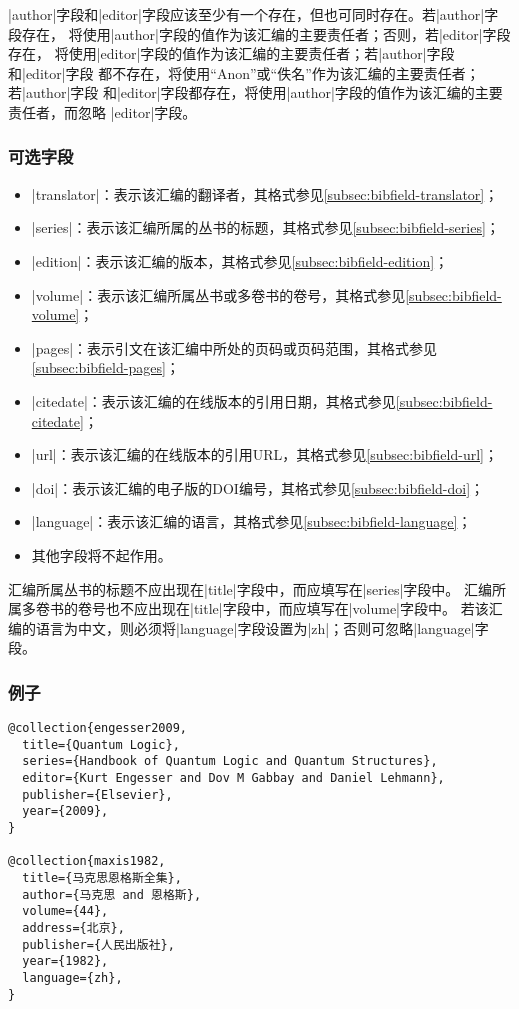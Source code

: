 \begin{note}
|author|字段和|editor|字段应该至少有一个存在，但也可同时存在。若|author|字段存在，
{\BibTeX}将使用|author|字段的值作为该汇编的主要责任者；否则，若|editor|字段存在，
{\BibTeX}将使用|editor|字段的值作为该汇编的主要责任者；若|author|字段和|editor|字段
都不存在，{\BibTeX}将使用``Anon''或``佚名''作为该汇编的主要责任者；若|author|字段
和|editor|字段都存在，{\BibTeX}将使用|author|字段的值作为该汇编的主要责任者，而忽略
|editor|字段。
\end{note}

\subsubsection{可选字段}

\begin{itemize}
\item |translator|：表示该汇编的翻译者，其格式参见\ref{subsec:bibfield-translator}；
\item |series|：表示该汇编所属的丛书的标题，其格式参见\ref{subsec:bibfield-series}；
\item |edition|：表示该汇编的版本，其格式参见\ref{subsec:bibfield-edition}；
\item |volume|：表示该汇编所属丛书或多卷书的卷号，其格式参见\ref{subsec:bibfield-volume}；
\item |pages|：表示引文在该汇编中所处的页码或页码范围，其格式参见\ref{subsec:bibfield-pages}；
\item |citedate|：表示该汇编的在线版本的引用日期，其格式参见\ref{subsec:bibfield-citedate}；
\item |url|：表示该汇编的在线版本的引用URL，其格式参见\ref{subsec:bibfield-url}；
\item |doi|：表示该汇编的电子版的DOI编号，其格式参见\ref{subsec:bibfield-doi}；
\item |language|：表示该汇编的语言，其格式参见\ref{subsec:bibfield-language}；
\item 其他字段将不起作用。
\end{itemize}

\begin{note}
汇编所属丛书的标题不应出现在|title|字段中，而应填写在|series|字段中。
汇编所属多卷书的卷号也不应出现在|title|字段中，而应填写在|volume|字段中。
若该汇编的语言为中文，则必须将|language|字段设置为|zh|；否则可忽略|language|字段。
\end{note}

\subsubsection{例子}

\begin{verbatim}
@collection{engesser2009,
  title={Quantum Logic},
  series={Handbook of Quantum Logic and Quantum Structures},
  editor={Kurt Engesser and Dov M Gabbay and Daniel Lehmann},
  publisher={Elsevier},  
  year={2009},  
}

@collection{maxis1982,
  title={马克思恩格斯全集},
  author={马克思 and 恩格斯},  
  volume={44},
  address={北京},
  publisher={人民出版社},
  year={1982},
  language={zh},
}
\end{verbatim}

